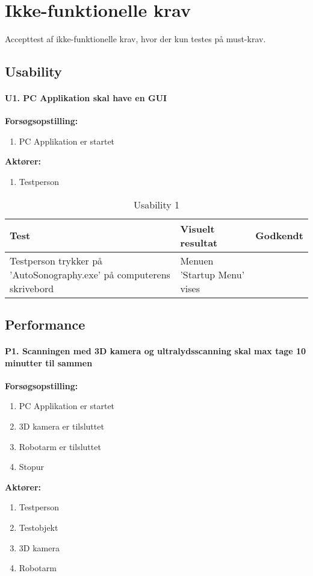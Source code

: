 \chapter{Ikke-funktionelle krav}\label{Ikkefunktionellekrav}
Accepttest af ikke-funktionelle krav, hvor der kun testes på must-krav. 

\section{Usability}
\subsubsection{U1. PC Applikation skal have en GUI}
\textbf{Forsøgsopstilling:}
\begin{enumerate}
\item PC Applikation er startet 
\end{enumerate}
\textbf{Aktører:}
\begin{enumerate}
\item Testperson
\end{enumerate} 

\begin{table}[htb]
\begin{tabularx}{\textwidth}{|X|X|p{2cm}|}
\hline
\textbf{Test} & \textbf{Visuelt resultat} &\textbf{Godkendt}\\\hline    
Testperson trykker på 'AutoSonography.exe' på computerens skrivebord & Menuen 'Startup Menu' vises &\\\hline
\end{tabularx}
\caption{Usability 1}
\label{U1}
\end{table}

\newpage

\section{Performance}
\subsubsection{P1. Scanningen med 3D kamera og ultralydsscanning skal max tage 10 minutter til sammen}
\textbf{Forsøgsopstilling:}
\begin{enumerate}
\item PC Applikation er startet
\item 3D kamera er tilsluttet
\item Robotarm er tilsluttet
\item Stopur
\end{enumerate}
\textbf{Aktører:}
\begin{enumerate}
\item Testperson
\item Testobjekt
\item 3D kamera 
\item Robotarm
\end{enumerate}

